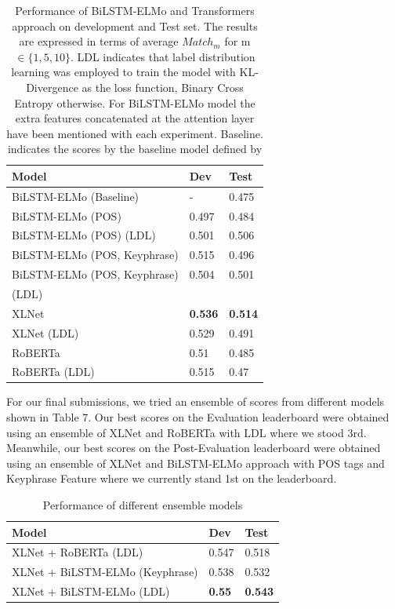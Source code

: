 \documentclass[letterpaper]{article} %
\begin{document}
\begin{table}[h!]
\centering
\begin{tabular}{ |l|l|l| }
\hline
\textbf{Model} & \textbf{Dev} & \textbf{Test} \\
\hline
BiLSTM-ELMo (Baseline)  & - & 0.475 \\
\hline
BiLSTM-ELMo (POS)  & 0.497 & 0.484 \\
\hline
BiLSTM-ELMo (POS) (LDL) & 0.501 & 0.506 \\
\hline
BiLSTM-ELMo (POS, Keyphrase) & 0.515 & 0.496 \\
\hline
BiLSTM-ELMo (POS, Keyphrase) & 0.504 & 0.501 \\
(LDL) & & \\
\hline
XLNet & \textbf{0.536} & \textbf{0.514} \\
\hline
XLNet (LDL) & 0.529 & 0.491 \\
\hline
RoBERTa & 0.51 & 0.485\\
\hline
RoBERTa (LDL) & 0.515 & 0.47 \\
\hline
\end{tabular}

\caption{Performance of BiLSTM-ELMo and Transformers approach on development and Test set. The results are expressed in terms of average $Match_m$ for m $\in \{1,5,10\}$. LDL indicates that label distribution learning was employed to train the model with KL-Divergence as the loss function, Binary Cross Entropy otherwise. For BiLSTM-ELMo model the extra features concatenated at the attention layer have been mentioned with each experiment. Baseline. indicates the scores by the baseline model defined by \citet{shirani2019learning}}
\label{table:5}
\end{table}
For our final submissions, we tried an ensemble of scores from different models shown in Table 7. Our best scores on the Evaluation leaderboard were obtained using an ensemble of XLNet and RoBERTa with LDL where we stood 3rd. Meanwhile, our best scores on the Post-Evaluation leaderboard were obtained using an ensemble of XLNet and BiLSTM-ELMo approach with POS tags and Keyphrase Feature where we currently stand 1st on the leaderboard.

\begin{table}[h!]
\centering
\begin{tabular}{|l|l|l|}
\hline
\textbf{Model} & \textbf{Dev} & \textbf{Test}  \\
\hline
XLNet + RoBERTa (LDL) & 0.547 & 0.518 \\
\hline
XLNet + BiLSTM-ELMo (Keyphrase)& 0.538 & 0.532 \\
\hline
XLNet + BiLSTM-ELMo (LDL) & \textbf{0.55} & \textbf{0.543} \\
\hline
\end{tabular}
\caption{Performance of different ensemble models}
\label{table:6}
\end{table}
\end{document}

